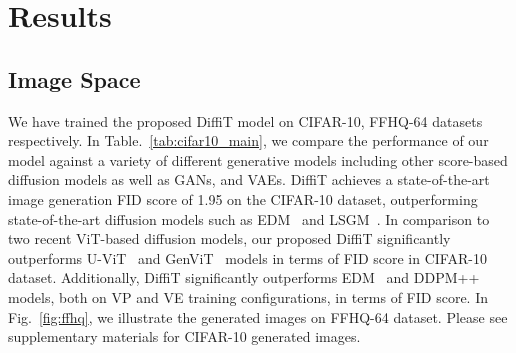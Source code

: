 \section{Results}
\label{sec:results}

\subsection{Image Space}
We have trained the proposed DiffiT model on CIFAR-10, FFHQ-64 datasets respectively. In Table.~\ref{tab:cifar10_main}, we compare the performance of our model against a variety of different generative models including other score-based diffusion models as well as GANs, and VAEs. DiffiT achieves a state-of-the-art image generation FID score of 1.95 on the CIFAR-10 dataset, outperforming state-of-the-art diffusion models such as EDM~\cite{karras2022elucidating} and LSGM~\cite{vahdat2021score}. In comparison to two recent ViT-based diffusion models, our proposed DiffiT significantly outperforms U-ViT~\cite{bao2022all} and GenViT~\cite{yang2022your} models in terms of FID score in CIFAR-10 dataset. Additionally, DiffiT significantly outperforms EDM~\cite{karras2022elucidating} and DDPM++~\cite{song2020score} models, both on VP and VE training configurations, in terms of FID score. In Fig.~\ref{fig:ffhq}, we illustrate the generated images on FFHQ-64 dataset. Please see supplementary materials for CIFAR-10 generated images.

